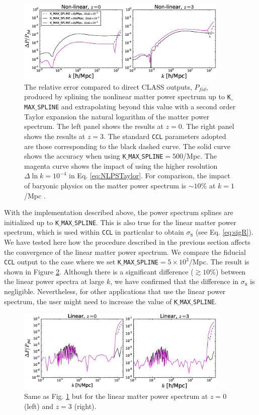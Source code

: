 \documentclass[\docopts]{\docclass}
\newcommand{\ccl}{{\tt CCL}\xspace}
\begin{document}
\begin{figure}
\centering
\includegraphics[width=0.9\textwidth]{PS_converge_nonlin.eps}
\caption{The relative error compared to direct CLASS outputs, $P_{fid}$, produced by splining the nonlinear matter power spectrum up to {\tt K$\_$MAX$\_$SPLINE} and extrapolating beyond this value with a second order Taylor expansion the natural logarithm of the matter power spectrum. The left panel shows the results at $z=0$. The right panel shows the results at $z=3$. The standard \ccl parameters adopted are those corresponding to the black dashed curve. The solid curve shows the accuracy when using {\tt K$\_$MAX$\_$SPLINE}$=500$/Mpc. The magenta curve shows the impact of using the higher resolution $\Delta\ln k=10^{-4}$ in Eq. \ref{eq:NLPSTaylor}. For comparison, the impact of baryonic physics on the matter power spectrum is $\sim 10\%$ at $k=1$/Mpc \citep{Schneider15}.}
\label{fig:NLextrapol}
\end{figure}

With the implementation described above, the power spectrum splines are initialized up to {\tt K$\_$MAX$\_$SPLINE}. This is also true for the linear matter power spectrum, which is used within \ccl in particular to obtain $\sigma_8$ (see Eq. \ref{eq:sigR}). We have tested here how the procedure described in the previous section affects the convergence of the linear matter power spectrum. We compare the fiducial \ccl output to the case where we set {\tt K$\_$MAX$\_$SPLINE}$=5\times 10^3/$Mpc. The result is shown in Figure \ref{fig:Lextrapol}. Although there is a significant difference ($\gtrsim 10\%$) between the linear power spectra at large $k$, we have confirmed that the difference in $\sigma_8$ is negligible. Nevertheless, for other applications that use the linear power spectrum, the user might need to increase the value of {\tt K$\_$MAX$\_$SPLINE}.

\begin{figure}
\centering
\includegraphics[width=0.9\textwidth]{PS_converge_lin.eps}
\caption{Same as Fig. \ref{fig:NLextrapol} but for the linear matter power spectrum at $z=0$ (left) and $z=3$ (right).}
\label{fig:Lextrapol}
\end{figure}
\end{document}
